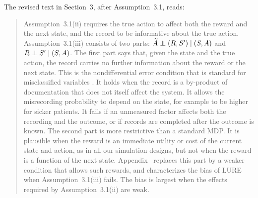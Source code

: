 \documentclass[12pt]{article}
\newcommand{\res}[1]{{\color{red}{#1}}}
\newcommand\independent{\protect\mathpalette{\protect\independenT}{\perp}}
\def\independenT#1#2{\mathrel{\rlap{$#1#2$}\mkern2mu{#1#2}}}
\newcommand{\0}{\boldsymbol{0}}
\theoremstyle{definition}
\newenvironment{reproducedtext}{\begin{quote}\small}{\end{quote}}
\begin{document}
The revised text in Section~3, after Assumption~3.1, reads:
\begin{reproducedtext}
Assumption~3.1(ii) requires the true action to affect both the reward and the next state, and the record to be informative about the true action. Assumption~3.1(iii) consists of two parts: $\widetilde A\independent (R,S')\mid (S,A)$ and $R\independent S'\mid (S,A)$. The first part says that, given the state and the true action, the record carries no further information about the reward or the next state. This is the nondifferential error condition that is standard for misclassified variables \citep{carroll2006measurement}. It holds when the record is a by-product of documentation that does not itself affect the system. It allows the misrecording probability to depend on the state, for example to be higher for sicker patients. It fails if an unmeasured factor affects both the recording and the outcome, or if records are completed after the outcome is known. The second part is more restrictive than a standard MDP. It is plausible when the reward is an immediate utility or cost of the current state and action, as in all our simulation designs, but not when the reward is a function of the next state. Appendix~\res{C} replaces this part by a weaker condition that allows such rewards, and characterizes the bias of LURE when Assumption~3.1(iii) fails. The bias is largest when the effects required by Assumption~3.1(ii) are weak.
\end{reproducedtext}
\end{document}
